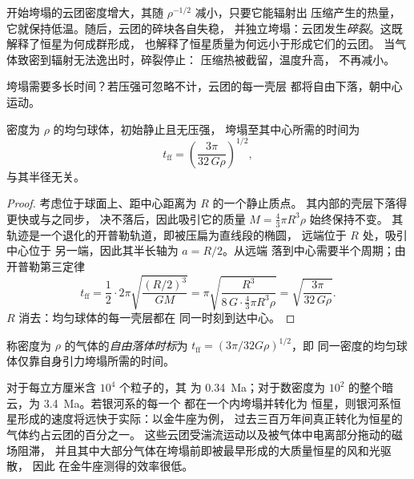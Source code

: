 开始垮塌的云团密度增大，其随
$\rho^{-1/2}$ 减小，只要它能辐射出
压缩产生的热量，它就保持低温。随后，云团的碎块各自失稳，
并独立垮塌：云团发生\emph{碎裂}。这既解释了恒星为何成群形成，
也解释了恒星质量为何远小于形成它们的云团。
当气体致密到辐射无法逸出时，碎裂停止：
压缩热被截留，温度升高，
不再减小。

垮塌需要多长时间？若压强可忽略不计，云团的每一壳层
都将自由下落，朝中心运动。

\begin{proposition}[自由落体时标]\label{prop:b2:ism-star-formation:free-fall}
密度为 $\rho$ 的均匀球体，初始静止且无压强，
垮塌至其中心所需的时间为
\[
  t_{\mathrm{ff}} = \left(\frac{3\pi}{32\,G\rho}\right)^{1/2},
\]
与其半径无关。
\end{proposition}

\begin{proof}
考虑位于球面上、距中心距离为 $R$ 的一个静止质点。
其内部的壳层下落得更快或与之同步，
决不落后，因此吸引它的质量 $M = \tfrac43\pi R^3\rho$ 始终保持不变。
其轨迹是一个退化的开普勒轨道，即被压扁为直线段的椭圆，
远端位于 $R$ 处，吸引中心位于
另一端，因此其半长轴为 $a = R/2$。从远端
落到中心需要半个周期；由开普勒第三定律
\[
  t_{\mathrm{ff}} = \frac12\cdot 2\pi\sqrt{\frac{(R/2)^3}{GM}}
  = \pi\sqrt{\frac{R^3}{8\,G\cdot\frac43\pi R^3\rho}}
  = \sqrt{\frac{3\pi}{32\,G\rho}} .
\]
$R$ 消去：均匀球体的每一壳层都在
同一时刻到达中心。
\end{proof}

\begin{definition}[自由落体时标]\label{def:b2:ism-star-formation:free-fall}
称密度为 $\rho$ 的气体的\emph{自由落体时标}为
$t_{\mathrm{ff}} = (3\pi/32G\rho)^{1/2}$，即
同一密度的均匀球体仅靠自身引力垮塌所需的时间。
\end{definition}

对于每立方厘米含 $10^4$ 个粒子的，其
为 \qty{0.34}{Ma}；对于数密度为 $10^2$ 的整个暗云，为 \qty{3.4}{Ma}。若银河系的每一个
都在一个内垮塌并转化为
恒星，则银河系恒星形成的速度将远快于实际：以金牛座为例，
过去三百万年间真正转化为恒星的气体约占云团的百分之一。
这些云团受湍流运动以及被气体中电离部分拖动的磁场阻滞，
并且其中大部分气体在垮塌前即被最早形成的大质量恒星的风和光驱散，
因此
在金牛座测得的效率很低。

